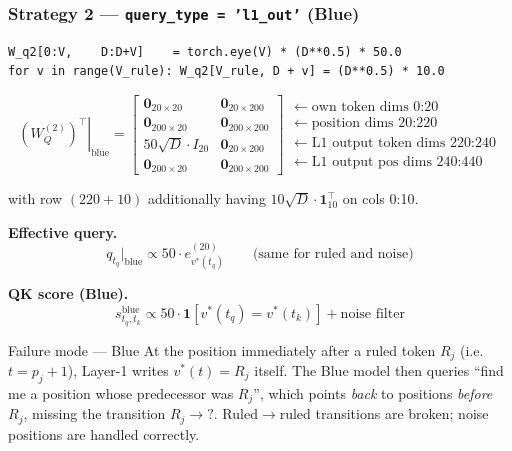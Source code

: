 \documentclass[11pt]{article}
\begin{document}
\subsubsection{Strategy 2 --- \texttt{query\_type = 'l1\_out'} (Blue)}

\begin{lstlisting}
W_q2[0:V,    D:D+V]    = torch.eye(V) * (D**0.5) * 50.0
for v in range(V_rule): W_q2[V_rule, D + v] = (D**0.5) * 10.0
\end{lstlisting}

\begin{equation}
\left.(W_Q^{(2)})^\top\right|_{\text{blue}}=
\begin{bmatrix}
\mathbf{0}_{20\times20}   & \mathbf{0}_{20\times200}\\
\mathbf{0}_{200\times20}  & \mathbf{0}_{200\times200}\\
50\sqrt{D}\cdot I_{20}    & \mathbf{0}_{20\times200}\\
\mathbf{0}_{200\times20}  & \mathbf{0}_{200\times200}
\end{bmatrix}
\begin{array}{l}
\leftarrow\text{own token dims }0\text{:}20\\
\leftarrow\text{position dims }20\text{:}220\\
\leftarrow\text{L1 output token dims }220\text{:}240\\
\leftarrow\text{L1 output pos dims }240\text{:}440
\end{array}
\tag{20}
\end{equation}

with row $(220{+}10)$ additionally having $10\sqrt{D}\cdot\mathbf{1}_{10}^\top$ on cols 0:10.

\medskip
\textbf{Effective query.}
\[
q_{t_q}\big|_{\text{blue}}\propto 50\cdot e_{v^*(t_q)}^{(20)}
\qquad\text{(same for ruled and noise)}
\tag{21}
\]

\textbf{QK score (Blue).}
\[
s_{t_q,t_k}^{\text{blue}}\propto 50\cdot\mathbf{1}[v^*(t_q)=v^*(t_k)]+\text{noise filter}
\tag{22}
\]

\begin{warningbox}{Failure mode --- Blue}
At the position immediately after a ruled token $R_j$ (i.e.\ $t=p_j{+}1$), Layer-1 writes
$v^*(t)=R_j$ itself. The Blue model then queries ``find me a position whose predecessor was $R_j$'',
which points \emph{back} to positions \emph{before} $R_j$, missing the transition $R_j\!\to\!?$.
Ruled$\to$ruled transitions are broken; noise positions are handled correctly.
\end{warningbox}
\end{document}
